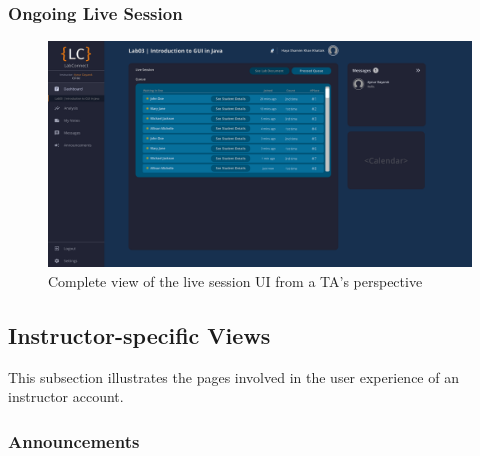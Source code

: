 \documentclass[a4paper, 12pt]{article}
\begin{document}
    
    
    
    
    
    
    
    
    
    
    
    
    
    \pagebreak
    
    \subsubsection{Ongoing Live Session}
     
    \begin{figure}[H]
        \centering
        \includegraphics[width=\textwidth]{ta_live_session}
        \caption{Complete view of the live session UI from a TA's perspective}
        \label{fig:ta_live_session_full}
    \end{figure}
    

    
    
    
    
    
    
    
    
    
    \pagebreak
    
    
    \subsection{Instructor-specific Views}
    
    This subsection illustrates the pages involved in the user experience of an instructor account.
    
    \subsubsection{Announcements}
     
\end{document}
